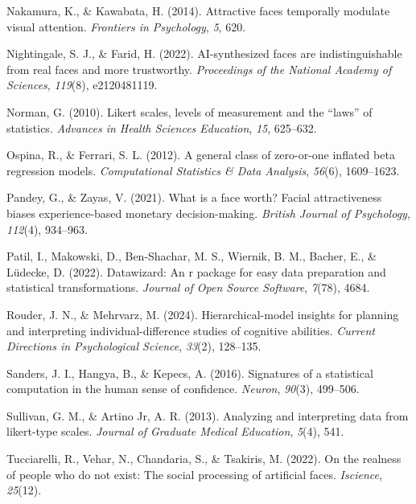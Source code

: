 \documentclass[
  jou,
  floatsintext,
  longtable,
  nolmodern,
  notxfonts,
  notimes,
  colorlinks=true,linkcolor=blue,citecolor=blue,urlcolor=blue]{apa7}
\newlength{\cslhangindent}
\newenvironment{CSLReferences}[2] %
 {\begin{list}{}{%
  \setlength{\itemindent}{0pt}
  \setlength{\leftmargin}{0pt}
  \setlength{\parsep}{0pt}
  \ifodd #1
   \setlength{\leftmargin}{\cslhangindent}
   \setlength{\itemindent}{-1\cslhangindent}
  \fi
  \setlength{\itemsep}{#2\baselineskip}}}
 {\end{list}}
\begin{document}
\begin{CSLReferences}{1}{0}
Nakamura, K., \& Kawabata, H. (2014). Attractive faces temporally
modulate visual attention. \emph{Frontiers in Psychology}, \emph{5},
620.

Nightingale, S. J., \& Farid, H. (2022). AI-synthesized faces are
indistinguishable from real faces and more trustworthy.
\emph{Proceedings of the National Academy of Sciences}, \emph{119}(8),
e2120481119.

Norman, G. (2010). Likert scales, levels of measurement and the
{``laws''} of statistics. \emph{Advances in Health Sciences Education},
\emph{15}, 625--632.

Ospina, R., \& Ferrari, S. L. (2012). A general class of zero-or-one
inflated beta regression models. \emph{Computational Statistics \& Data
Analysis}, \emph{56}(6), 1609--1623.

Pandey, G., \& Zayas, V. (2021). What is a face worth? Facial
attractiveness biases experience-based monetary decision-making.
\emph{British Journal of Psychology}, \emph{112}(4), 934--963.

Patil, I., Makowski, D., Ben-Shachar, M. S., Wiernik, B. M., Bacher, E.,
\& Lüdecke, D. (2022). Datawizard: An r package for easy data
preparation and statistical transformations. \emph{Journal of Open
Source Software}, \emph{7}(78), 4684.

Rouder, J. N., \& Mehrvarz, M. (2024). Hierarchical-model insights for
planning and interpreting individual-difference studies of cognitive
abilities. \emph{Current Directions in Psychological Science},
\emph{33}(2), 128--135.

Sanders, J. I., Hangya, B., \& Kepecs, A. (2016). Signatures of a
statistical computation in the human sense of confidence. \emph{Neuron},
\emph{90}(3), 499--506.

Sullivan, G. M., \& Artino Jr, A. R. (2013). Analyzing and interpreting
data from likert-type scales. \emph{Journal of Graduate Medical
Education}, \emph{5}(4), 541.

Tucciarelli, R., Vehar, N., Chandaria, S., \& Tsakiris, M. (2022). On
the realness of people who do not exist: The social processing of
artificial faces. \emph{Iscience}, \emph{25}(12).


\end{CSLReferences}
\end{document}
